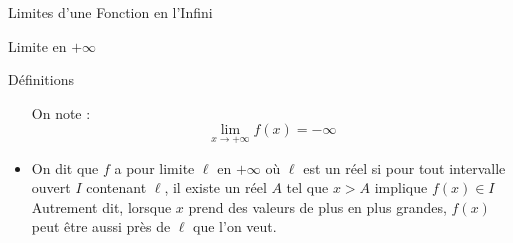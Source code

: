 \documentclass{coursbook}
\begin{document}
\begin{Gpartie}{Limites d'une Fonction en l'Infini}
\begin{Spartie}{Limite en $+\infty$}
\begin{SSpartie}{Définitions}
\begin{itemize}
                    On note : \[\boxed{\lim\limits_{x\to +\infty}f(x)=-\infty}\]
                    \begin{center}
                        \parbox{\linewidth}{}
                    \end{center}
                    \item   On dit que $f$ a pour limite $\ell$ en $+\infty$ où $\ell$ est un réel si pour tout intervalle ouvert $I$ contenant $\ell$, il existe un réel $A$ tel que $x>A$ implique $f(x)\in I$ \\ Autrement dit, lorsque $x$ prend des valeurs de plus en plus grandes, $f(x)$ peut être aussi près de $\ell$ que l'on veut.
                    

\end{itemize}
\end{SSpartie}
\end{Spartie}
\end{Gpartie}
\end{document}
